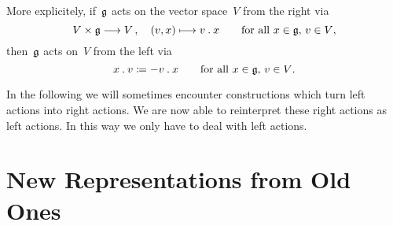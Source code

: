 \begin{remark}
  More explicitely, if~$\mathfrak{g}$ acts on the vector space~$V$ from the right via
  \[
    V \times \glie
    \to
    V \,,
    \quad
    (v,x)
    \mapsto
    v \act x
    \qquad
    \text{for all~$x \in \glie$,~$v \in V$,}
  \]
  then~$\mathfrak{g}$ acts on~$V$ from the left via
  \[
    x \mathbin{.} v
    \coloneqq
    -v \mathbin{.} x
    \qquad
    \text{for all~$x \in \mathfrak{g}$,~$v \in V$.}
  \]

  In the following we will sometimes encounter constructions which turn left actions into right actions.
  We are now able to reinterpret these right actions as left actions.
  In this way we only have to deal with left actions.
\end{remark}





\section{New Representations from Old Ones}


